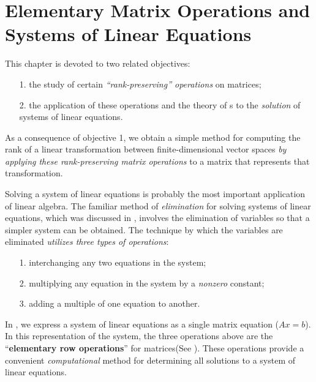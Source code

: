 \chapter{Elementary Matrix Operations and Systems
of Linear Equations} \label{ch 3}

This chapter is devoted to two related objectives:
\begin{enumerate}
\item[1.] the study of certain \emph{``rank-preserving'' operations} on matrices;
\item[2.] the application of these operations and the theory of \LTRAN{}s to the \emph{solution} of systems of linear equations.
\end{enumerate}

As a consequence of objective 1, we obtain a simple method for computing the rank of a linear transformation between finite-dimensional vector spaces
\emph{by applying these rank-preserving matrix operations} to a matrix that represents that transformation.

Solving a system of linear equations is probably the most important application of linear algebra.
The familiar method of \emph{elimination} for solving systems of linear equations, which was discussed in , involves the elimination of variables so that a simpler system can be obtained.
The technique by which the variables are eliminated \emph{utilizes three types of operations}:
\begin{enumerate}
\item [1.] interchanging any two equations in the system;
\item [2.] multiplying any equation in the system by a \emph{nonzero} constant;
\item[3.] adding a multiple of one equation to another.
\end{enumerate}

In , we express a system of linear equations as a single matrix equation (\(Ax = b\)).
In this representation of the system, the three operations above are the ``\textbf{elementary row operations}'' for matrices(See ).
These operations provide a convenient \emph{computational} method for determining all solutions to a system of linear equations.






